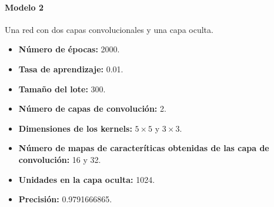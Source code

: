 \paragraph{Modelo 2}


Una red con dos capas convolucionales y una capa oculta.

\begin{itemize}
\item \textbf{Número de épocas:} 2000.
\item \textbf{Tasa de aprendizaje:} 0.01.
\item \textbf{Tamaño del lote:} 300.
\item \textbf{Número de capas de convolución:} 2.
\item \textbf{Dimensiones de los kernels:} $5 \times 5$ y $3 \times 3$.
\item \textbf{Número de mapas de caracteríticas obtenidas de las capa de convolución:} 16 y 32.
\item \textbf{Unidades en la capa oculta:} 1024.
\item \textbf{Precisión:} 0.9791666865.
\end{itemize}

